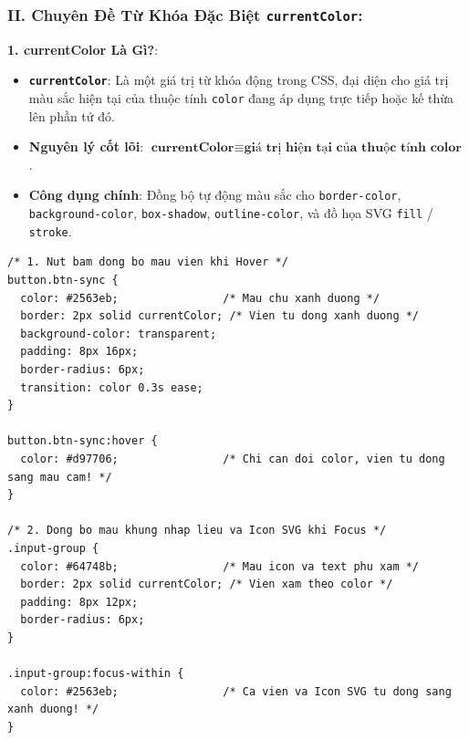 \documentclass[11pt,oneside]{book}
\newcommand{\codeinline}[1]{\textcolor{accentOrange}{\texttt{#1}}}
\begin{document}
\subsubsection*{II. Chuyên Đề Từ Khóa Đặc Biệt \codeinline{currentColor}:}

\begin{conceptBox}
\textbf{1. currentColor Là Gì?}:
\begin{itemize}[leftmargin=1.5em, itemsep=3pt, parsep=0pt]
    \item \textbf{\codeinline{currentColor}}: Là một giá trị từ khóa động trong CSS, đại diện cho giá trị màu sắc hiện tại của thuộc tính \codeinline{color} đang áp dụng trực tiếp hoặc kế thừa lên phần tử đó.
    \item \textbf{Nguyên lý cốt lõi}: $\mathbf{\text{currentColor} \equiv \text{giá trị hiện tại của thuộc tính color}}$.
    \item \textbf{Công dụng chính}: Đồng bộ tự động màu sắc cho \codeinline{border-color}, \codeinline{background-color}, \codeinline{box-shadow}, \codeinline{outline-color}, và đồ họa SVG \codeinline{fill} / \codeinline{stroke}.
\end{itemize}
\end{conceptBox}

\begin{codeWindow}
\begin{lstlisting}[language=CSS3]
/* 1. Nut bam dong bo mau vien khi Hover */
button.btn-sync {
  color: #2563eb;                /* Mau chu xanh duong */
  border: 2px solid currentColor; /* Vien tu dong xanh duong */
  background-color: transparent;
  padding: 8px 16px;
  border-radius: 6px;
  transition: color 0.3s ease;
}

button.btn-sync:hover {
  color: #d97706;                /* Chi can doi color, vien tu dong sang mau cam! */
}

/* 2. Dong bo mau khung nhap lieu va Icon SVG khi Focus */
.input-group {
  color: #64748b;                /* Mau icon va text phu xam */
  border: 2px solid currentColor; /* Vien xam theo color */
  padding: 8px 12px;
  border-radius: 6px;
}

.input-group:focus-within {
  color: #2563eb;                /* Ca vien va Icon SVG tu dong sang xanh duong! */
}
\end{lstlisting}
\end{codeWindow}
\end{document}

